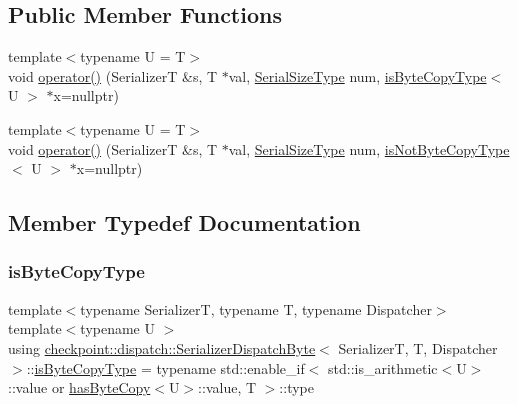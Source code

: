 \subsection*{Public Member Functions}
\begin{DoxyCompactItemize}
\item 
{\footnotesize template$<$typename U  = T$>$ }\\void \hyperlink{structcheckpoint_1_1dispatch_1_1_serializer_dispatch_byte_ab45639bcd8124d1057e074358f5ccc90}{operator()} (SerializerT \&s, T $\ast$val, \hyperlink{namespacecheckpoint_a083f6674da3f94c2901b18c6d238217c}{Serial\+Size\+Type} num, \hyperlink{structcheckpoint_1_1dispatch_1_1_serializer_dispatch_byte_a7fd331c3b3693e8e69ae5cf7f5aeab93}{is\+Byte\+Copy\+Type}$<$ U $>$ $\ast$x=nullptr)
\item 
{\footnotesize template$<$typename U  = T$>$ }\\void \hyperlink{structcheckpoint_1_1dispatch_1_1_serializer_dispatch_byte_ae94c1edf6bab8281506605824c95b3b1}{operator()} (SerializerT \&s, T $\ast$val, \hyperlink{namespacecheckpoint_a083f6674da3f94c2901b18c6d238217c}{Serial\+Size\+Type} num, \hyperlink{structcheckpoint_1_1dispatch_1_1_serializer_dispatch_byte_af7214bae56db9cc342bc01fc61a8f403}{is\+Not\+Byte\+Copy\+Type}$<$ U $>$ $\ast$x=nullptr)
\end{DoxyCompactItemize}


\subsection{Member Typedef Documentation}
\mbox{\label{structcheckpoint_1_1dispatch_1_1_serializer_dispatch_byte_a7fd331c3b3693e8e69ae5cf7f5aeab93}} 
\subsubsection{\texorpdfstring{is\+Byte\+Copy\+Type}{isByteCopyType}}
{\footnotesize\ttfamily template$<$typename SerializerT, typename T, typename Dispatcher$>$ \\
template$<$typename U $>$ \\
using \hyperlink{structcheckpoint_1_1dispatch_1_1_serializer_dispatch_byte}{checkpoint\+::dispatch\+::\+Serializer\+Dispatch\+Byte}$<$ SerializerT, T, Dispatcher $>$\+::\hyperlink{structcheckpoint_1_1dispatch_1_1_serializer_dispatch_byte_a7fd331c3b3693e8e69ae5cf7f5aeab93}{is\+Byte\+Copy\+Type} =  typename std\+::enable\+\_\+if$<$ std\+::is\+\_\+arithmetic$<$U$>$\+::value or \hyperlink{structcheckpoint_1_1dispatch_1_1has_byte_copy}{has\+Byte\+Copy}$<$U$>$\+::value, T $>$\+::type}

